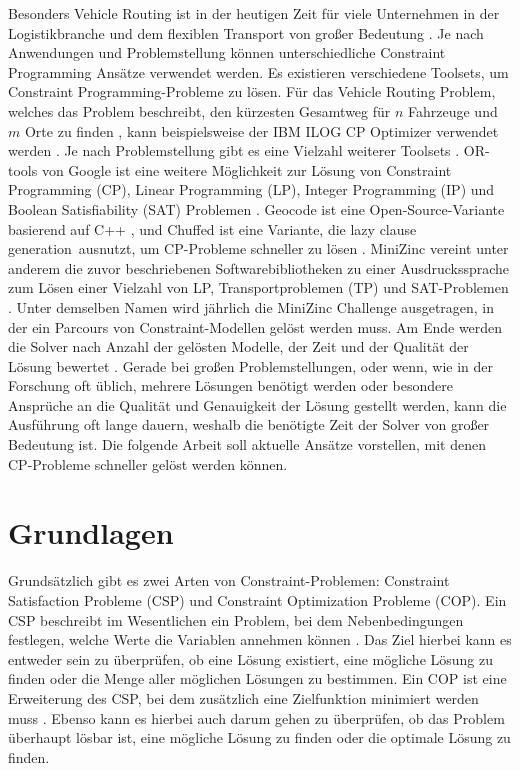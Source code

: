 Besonders Vehicle Routing ist in der heutigen Zeit für viele Unternehmen in der
Logistikbranche und dem flexiblen Transport von großer Bedeutung
\cite[1]{delec22jo}. Je nach Anwendungen und Problemstellung können
unterschiedliche Constraint Programming Ansätze verwendet werden. Es existieren
verschiedene Toolsets, um Constraint Programming-Probleme zu lösen. Für das
Vehicle Routing Problem, welches das Problem beschreibt, den kürzesten Gesamtweg
für \( n \) Fahrzeuge und \( m \) Orte zu finden \cite[222]{labor18jo}, kann
beispielsweise der IBM ILOG CP Optimizer verwendet werden \cite{IBMIwe}. Je nach
Problemstellung gibt es eine Vielzahl weiterer Toolsets \cite{Solviwea}.
OR-tools von Google ist eine weitere Möglichkeit zur Lösung von Constraint
Programming (CP), Linear Programming (LP), Integer Programming (IP) und Boolean
Satisfiability (SAT) Problemen \cite{ORToowe}. Geocode ist eine
Open-Source-Variante basierend auf C++ \cite{GECODwe}, und Chuffed ist eine
Variante, die \grqq lazy clause generation\grqq\ ausnutzt, um CP-Probleme
schneller zu lösen \cite{Chuff24co}. MiniZinc vereint unter anderem die zuvor
beschriebenen Softwarebibliotheken zu einer Ausdruckssprache zum Lösen einer
Vielzahl von LP, Transportproblemen (TP) und SAT-Problemen \cite{MiniZwe}. Unter
demselben Namen wird jährlich die MiniZinc Challenge ausgetragen, in der ein
Parcours von Constraint-Modellen gelöst werden muss. Am Ende werden die Solver
nach Anzahl der gelösten Modelle, der Zeit und der Qualität der Lösung bewertet
\cite{Homewe}. Gerade bei großen Problemstellungen, oder wenn, wie in der
Forschung oft üblich, mehrere Lösungen benötigt werden oder besondere Ansprüche
an die Qualität und Genauigkeit der Lösung gestellt werden, kann die Ausführung
oft lange dauern, weshalb die benötigte Zeit der Solver von großer Bedeutung
ist. Die folgende Arbeit soll aktuelle Ansätze vorstellen, mit denen CP-Probleme
schneller gelöst werden können.


\section{Grundlagen}
\label{sec:Grundlagen}
Grundsätzlich gibt es zwei Arten von Constraint-Problemen: Constraint
Satisfaction Probleme (CSP) und Constraint Optimization Probleme (COP). Ein CSP
beschreibt im Wesentlichen ein Problem, bei dem Nebenbedingungen festlegen,
welche Werte die Variablen annehmen können \cite[13]{rossi06bo}. Das Ziel
hierbei kann es entweder sein zu überprüfen, ob eine Lösung existiert, eine
mögliche Lösung zu finden oder die Menge aller möglichen Lösungen zu bestimmen.
Ein COP ist eine Erweiterung des CSP, bei dem zusätzlich eine Zielfunktion
minimiert werden muss \cite[171]{rossi06bo}. Ebenso kann es hierbei auch darum
gehen zu überprüfen, ob das Problem überhaupt lösbar ist, eine mögliche Lösung
zu finden oder die optimale Lösung zu finden.


